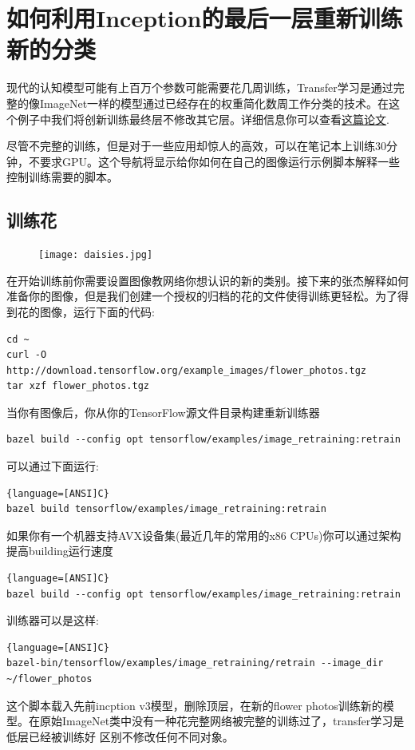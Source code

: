 \section{如何利用Inception的最后一层重新训练新的分类}
现代的认知模型可能有上百万个参数可能需要花几周训练，Transfer学习是通过完整的像ImageNet一样的模型通过已经存在的权重简化数周工作分类的技术。在这个例子中我们将创新训练最终层不修改其它层。详细信息你可以查看\href{http://arxiv.org/pdf/1310.1531v1.pdf}{这篇论文}.

尽管不完整的训练，但是对于一些应用却惊人的高效，可以在笔记本上训练30分钟，不要求GPU。这个导航将显示给你如何在自己的图像运行示例脚本解释一些控制训练需要的脚本。
\subsection{训练花}
\begin{center}
\begin{figure}
\texttt{[image: daisies.jpg]}
\end{figure}
\end{center}
在开始训练前你需要设置图像教网络你想认识的新的类别。接下来的张杰解释如何准备你的图像，但是我们创建一个授权的归档的花的文件使得训练更轻松。为了得到花的图像，运行下面的代码:
\begin{lstlisting}[language={[ANSI]C}]
cd ~
curl -O http://download.tensorflow.org/example_images/flower_photos.tgz
tar xzf flower_photos.tgz
\end{lstlisting}
当你有图像后，你从你的TensorFlow源文件目录构建重新训练器
\begin{lstlisting}[language={[ANSI]C}]
bazel build --config opt tensorflow/examples/image_retraining:retrain
\end{lstlisting}
可以通过下面运行:
\begin{lstlisting}{language=[ANSI]C}
bazel build tensorflow/examples/image_retraining:retrain
\end{lstlisting}
如果你有一个机器支持AVX设备集(最近几年的常用的x86 CPUs)你可以通过架构提高building运行速度
\begin{lstlisting}{language=[ANSI]C}
bazel build --config opt tensorflow/examples/image_retraining:retrain
\end{lstlisting}
训练器可以是这样:
\begin{lstlisting}{language=[ANSI]C}
bazel-bin/tensorflow/examples/image_retraining/retrain --image_dir ~/flower_photos
\end{lstlisting}
这个脚本载入先前incption v3模型，删除顶层，在新的flower photos训练新的模型。在原始ImageNet类中没有一种花完整网络被完整的训练过了，transfer学习是低层已经被训练好
区别不修改任何不同对象。

